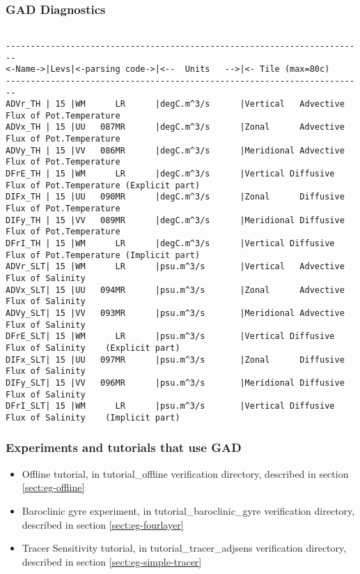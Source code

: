 \subsubsection{GAD Diagnostics}
\label{sec:pkg:gad:diagnostics}

{\footnotesize
\begin{verbatim}

------------------------------------------------------------------------
<-Name->|Levs|<-parsing code->|<--  Units   -->|<- Tile (max=80c) 
------------------------------------------------------------------------
ADVr_TH | 15 |WM      LR      |degC.m^3/s      |Vertical   Advective Flux of Pot.Temperature
ADVx_TH | 15 |UU   087MR      |degC.m^3/s      |Zonal      Advective Flux of Pot.Temperature
ADVy_TH | 15 |VV   086MR      |degC.m^3/s      |Meridional Advective Flux of Pot.Temperature
DFrE_TH | 15 |WM      LR      |degC.m^3/s      |Vertical Diffusive Flux of Pot.Temperature (Explicit part)
DIFx_TH | 15 |UU   090MR      |degC.m^3/s      |Zonal      Diffusive Flux of Pot.Temperature
DIFy_TH | 15 |VV   089MR      |degC.m^3/s      |Meridional Diffusive Flux of Pot.Temperature
DFrI_TH | 15 |WM      LR      |degC.m^3/s      |Vertical Diffusive Flux of Pot.Temperature (Implicit part)
ADVr_SLT| 15 |WM      LR      |psu.m^3/s       |Vertical   Advective Flux of Salinity
ADVx_SLT| 15 |UU   094MR      |psu.m^3/s       |Zonal      Advective Flux of Salinity
ADVy_SLT| 15 |VV   093MR      |psu.m^3/s       |Meridional Advective Flux of Salinity
DFrE_SLT| 15 |WM      LR      |psu.m^3/s       |Vertical Diffusive Flux of Salinity    (Explicit part)
DIFx_SLT| 15 |UU   097MR      |psu.m^3/s       |Zonal      Diffusive Flux of Salinity
DIFy_SLT| 15 |VV   096MR      |psu.m^3/s       |Meridional Diffusive Flux of Salinity
DFrI_SLT| 15 |WM      LR      |psu.m^3/s       |Vertical Diffusive Flux of Salinity    (Implicit part)
\end{verbatim}
}

\subsubsection{Experiments and tutorials that use GAD}
\label{sec:pkg:gad:experiments}

\begin{itemize}
\item{Offline tutorial, in tutorial\_offline verification directory, described in section \ref{sect:eg-offline} }
\item{Baroclinic gyre experiment, in tutorial\_baroclinic\_gyre verification directory, described in 
      section \ref{sect:eg-fourlayer} }
\item{Tracer Sensitivity tutorial, in tutorial\_tracer\_adjsens verification directory, described in 
      section \ref{sect:eg-simple-tracer} }
\end{itemize}
